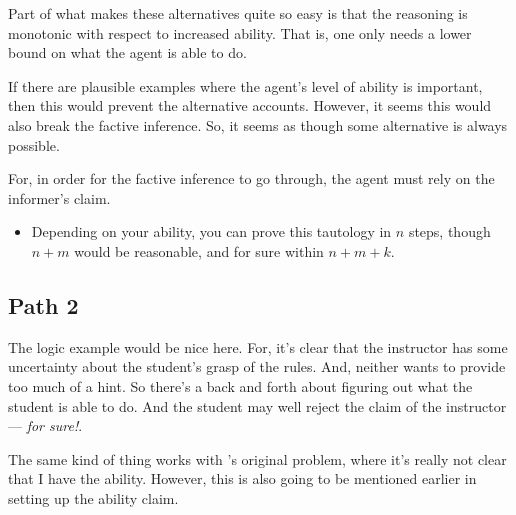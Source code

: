 \documentclass[10pt]{article}
\begin{document}
\begin{note}[Aside]
  Part of what makes these alternatives quite so easy is that the reasoning is monotonic with respect to increased ability.
  That is, one only needs a lower bound on what the agent is able to do.

  If there are plausible examples where the agent's level of ability is important, then this would prevent the alternative accounts.
  However, it seems this would also break the factive inference.
  So, it seems as though some alternative is always possible.

  For, in order for the factive inference to go through, the agent must rely on the informer's claim.
  \begin{itemize}
  \item Depending on your ability, you can prove this tautology in \(n\) steps, though \(n + m\) would be reasonable, and for sure within \(n + m + k\).
  \end{itemize}
\end{note}

\subsection{Path 2}
\label{sec:path-2}

\begin{note}
  The logic example would be nice here.
  For, it's clear that the instructor has some uncertainty about the student's grasp of the rules.
  And, neither wants to provide too much of a hint.
  So there's a back and forth about figuring out what the student is able to do.
  And the student may well reject the claim of the instructor --- \emph{for sure!}.
\end{note}

\begin{note}
  The same kind of thing works with \cite{Emms:2000aa}'s original problem, where it's really not clear that I have the ability.
  However, this is also going to be mentioned earlier in setting up the ability claim.
\end{note}
\end{document}
